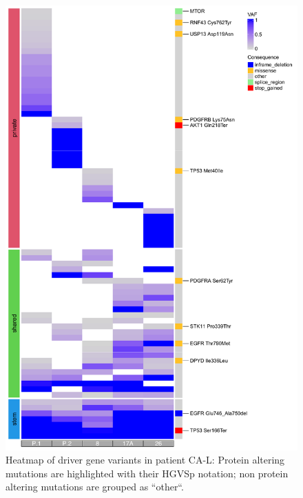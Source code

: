\begin{figure}[htp]
\centering
\includegraphics[width=.99\linewidth]{Figures/CASCADE/CA86/CA86varHeatmap.pdf}
\caption[Heatmap of driver gene variants in patient CA-L]{Heatmap of driver gene variants in patient CA-L: Protein altering mutations are highlighted with their HGVSp notation; non protein altering mutations are grouped as ``other``.} \label{fig:ca86heatmap}
\end{figure}


